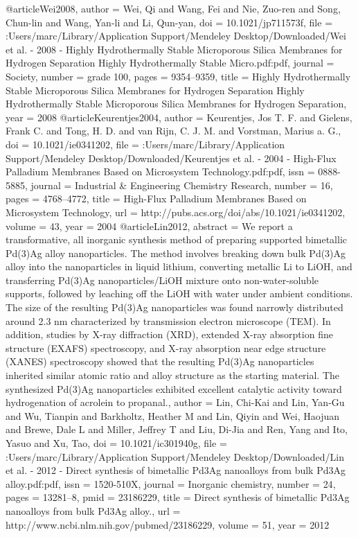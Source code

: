 @article{Wei2008,
author = {Wei, Qi and Wang, Fei and Nie, Zuo-ren and Song, Chun-lin and Wang, Yan-li and Li, Qun-yan},
doi = {10.1021/jp711573f},
file = {:Users/marc/Library/Application Support/Mendeley Desktop/Downloaded/Wei et al. - 2008 - Highly Hydrothermally Stable Microporous Silica Membranes for Hydrogen Separation Highly Hydrothermally Stable Micro.pdf:pdf},
journal = {Society},
number = {grade 100},
pages = {9354--9359},
title = {{Highly Hydrothermally Stable Microporous Silica Membranes for Hydrogen Separation Highly Hydrothermally Stable Microporous Silica Membranes for Hydrogen Separation}},
year = {2008}
}
@article{Keurentjes2004,
author = {Keurentjes, Jos T. F. and Gielens, Frank C. and Tong, H. D. and van Rijn, C. J. M. and Vorstman, Marius a. G.},
doi = {10.1021/ie0341202},
file = {:Users/marc/Library/Application Support/Mendeley Desktop/Downloaded/Keurentjes et al. - 2004 - High-Flux Palladium Membranes Based on Microsystem Technology.pdf:pdf},
issn = {0888-5885},
journal = {Industrial {\&} Engineering Chemistry Research},
number = {16},
pages = {4768--4772},
title = {{High-Flux Palladium Membranes Based on Microsystem Technology}},
url = {http://pubs.acs.org/doi/abs/10.1021/ie0341202},
volume = {43},
year = {2004}
}
@article{Lin2012,
abstract = {We report a transformative, all inorganic synthesis method of preparing supported bimetallic Pd(3)Ag alloy nanoparticles. The method involves breaking down bulk Pd(3)Ag alloy into the nanoparticles in liquid lithium, converting metallic Li to LiOH, and transferring Pd(3)Ag nanoparticles/LiOH mixture onto non-water-soluble supports, followed by leaching off the LiOH with water under ambient conditions. The size of the resulting Pd(3)Ag nanoparticles was found narrowly distributed around 2.3 nm characterized by transmission electron microscope (TEM). In addition, studies by X-ray diffraction (XRD), extended X-ray absorption fine structure (EXAFS) spectroscopy, and X-ray absorption near edge structure (XANES) spectroscopy showed that the resulting Pd(3)Ag nanoparticles inherited similar atomic ratio and alloy structure as the starting material. The synthesized Pd(3)Ag nanoparticles exhibited excellent catalytic activity toward hydrogenation of acrolein to propanal.},
author = {Lin, Chi-Kai and Lin, Yan-Gu and Wu, Tianpin and Barkholtz, Heather M and Lin, Qiyin and Wei, Haojuan and Brewe, Dale L and Miller, Jeffrey T and Liu, Di-Jia and Ren, Yang and Ito, Yasuo and Xu, Tao},
doi = {10.1021/ic301940g},
file = {:Users/marc/Library/Application Support/Mendeley Desktop/Downloaded/Lin et al. - 2012 - Direct synthesis of bimetallic Pd3Ag nanoalloys from bulk Pd3Ag alloy.pdf:pdf},
issn = {1520-510X},
journal = {Inorganic chemistry},
number = {24},
pages = {13281--8},
pmid = {23186229},
title = {{Direct synthesis of bimetallic Pd3Ag nanoalloys from bulk Pd3Ag alloy.}},
url = {http://www.ncbi.nlm.nih.gov/pubmed/23186229},
volume = {51},
year = {2012}
}
